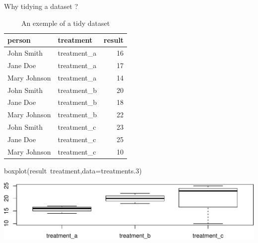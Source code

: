 \documentclass[14pt,ignorenonframetext,]{bredelebeamer}
\newenvironment{Shaded}{\begin{snugshade}}{\end{snugshade}}
\newcommand{\KeywordTok}[1]{\textcolor[rgb]{0.94,0.87,0.69}{#1}}
\newcommand{\DataTypeTok}[1]{\textcolor[rgb]{0.87,0.87,0.75}{#1}}
\newcommand{\DecValTok}[1]{\textcolor[rgb]{0.86,0.86,0.80}{#1}}
\newcommand{\OperatorTok}[1]{\textcolor[rgb]{0.94,0.94,0.82}{#1}}
\newcommand{\NormalTok}[1]{\textcolor[rgb]{0.80,0.80,0.80}{#1}}
\begin{document}
\begin{frame}[fragile]{Why tidying a dataset ?}

\begin{center}
\begin{table}[t]

\caption{\label{tab:unnamed-chunk-5}An exemple of a tidy dataset}
\centering
\begin{tabular}{l|l|r}
\hline
person & treatment & result\\
\hline
John Smith & treatment\_a & 16\\
\hline
Jane Doe & treatment\_a & 17\\
\hline
Mary Johnson & treatment\_a & 14\\
\hline
John Smith & treatment\_b & 20\\
\hline
Jane Doe & treatment\_b & 18\\
\hline
Mary Johnson & treatment\_b & 22\\
\hline
John Smith & treatment\_c & 23\\
\hline
Jane Doe & treatment\_c & 25\\
\hline
Mary Johnson & treatment\_c & 10\\
\hline
\end{tabular}
\end{table}
\end{center}

\begin{Shaded}
\begin{Highlighting}[]
\KeywordTok{boxplot}\NormalTok{(result}\OperatorTok{~}\NormalTok{treatment,}\DataTypeTok{data=}\NormalTok{treatments.}\DecValTok{3}\NormalTok{)}
\end{Highlighting}
\end{Shaded}

\includegraphics{tidyverse_28_03_files/figure-beamer/boxplot3-1.pdf}

\end{frame}
\end{document}

